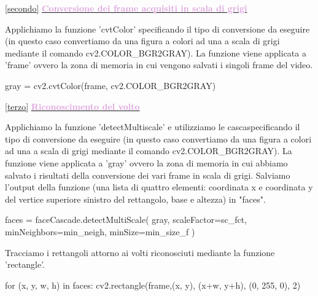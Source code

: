 \documentclass[12pt]{article}
\begin{document}
{  
  
\ref {secondo} \underline{\textbf{\textcolor{Plum}{Conversione dei frame acquisiti in scala di grigi}}}
 \vspace{1cm}
 
 
 Applichiamo la funzione 'cvtColor' specificando il tipo di conversione da eseguire (in questo caso convertiamo da una figura a colori ad una a scala di grigi mediante il comando cv2.COLOR\_BGR2GRAY). La funzione viene applicata a 'frame' ovvero la zona di memoria in cui vengono salvati i singoli frame del video.
 \vspace{1cm}
 
\begin{codice}
	gray = cv2.cvtColor(frame, cv2.COLOR_BGR2GRAY)
\end{codice}

 \vspace{2cm} 	
  	
  
\ref {terzo} \underline{\textbf{\textcolor{Plum}{Riconoscimento del volto}}}
\vspace{1cm}

Applichiamo la funzione 'detectMultiscale' e utilizziamo le cascaspecificando il tipo di conversione da eseguire (in questo caso convertiamo da una figura a colori ad una a scala di grigi mediante il comando cv2.COLOR\_BGR2GRAY). La funzione viene applicata a 'gray' ovvero la zona di memoria in cui abbiamo salvato i risultati della conversione dei vari frame in scala di grigi. Salviamo l'output della funzione (una lista di quattro elementi: coordinata x e coordinata y del vertice superiore sinistro del rettangolo, base e altezza) in "faces".  
\vspace{1cm}

\begin{codice}
    faces = faceCascade.detectMultiScale(       
        gray,
        scaleFactor=sc_fct,
        minNeighbors=min_neigh,
        minSize=min_size_f
        )
\end{codice}
\vspace{1cm}

Tracciamo i rettangoli attorno ai volti riconosciuti mediante la funzione 'rectangle'.
\vspace{1cm}

 \begin{codice}
    for (x, y, w, h) in faces:
            cv2.rectangle(frame,(x, y), (x+w, y+h), (0, 255, 0), 2)
\end{codice}

\vspace{2cm}	  	
  	
}
\end{document}
